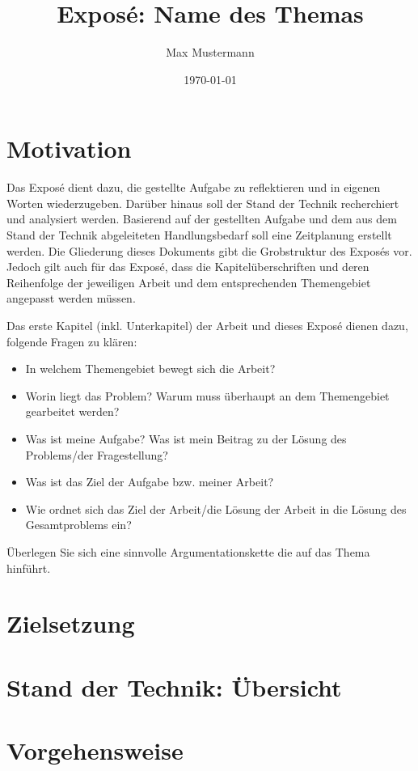 \documentclass[10pt, onseide, a4paper, DIV14]{scrartcl}
\author{Max Mustermann}
\title{Exposé: Name des Themas}
\date{\today}
\begin{document}
\maketitle
	
\section{Motivation}

Das Exposé dient dazu, die gestellte Aufgabe zu reflektieren und in eigenen Worten wiederzugeben. Darüber hinaus soll der Stand der Technik recherchiert und analysiert werden. Basierend auf der gestellten Aufgabe und dem aus dem Stand der Technik abgeleiteten Handlungsbedarf soll eine Zeitplanung erstellt werden. Die Gliederung dieses Dokuments gibt die Grobstruktur des Exposés vor. Jedoch gilt auch für das Exposé, dass die Kapitelüberschriften und deren Reihenfolge der jeweiligen Arbeit und dem entsprechenden Themengebiet angepasst werden müssen.

Das erste Kapitel (inkl. Unterkapitel) der Arbeit und dieses Exposé dienen dazu, folgende Fragen zu klären:

\begin{itemize}
    \item In welchem Themengebiet bewegt sich die Arbeit?
    \item Worin liegt das Problem? Warum muss überhaupt an dem Themengebiet gearbeitet werden?
    \item Was ist meine Aufgabe? Was ist mein Beitrag zu der Lösung des Problems/der Fragestellung?
    \item Was ist das Ziel der Aufgabe bzw. meiner Arbeit?
    \item Wie ordnet sich das Ziel der Arbeit/die Lösung der Arbeit in die Lösung des Gesamtproblems ein?
\end{itemize}

Überlegen Sie sich eine sinnvolle Argumentationskette die auf das Thema hinführt.


\section{Zielsetzung}

\section{Stand der Technik: Übersicht}

\section{Vorgehensweise}
\end{document}

